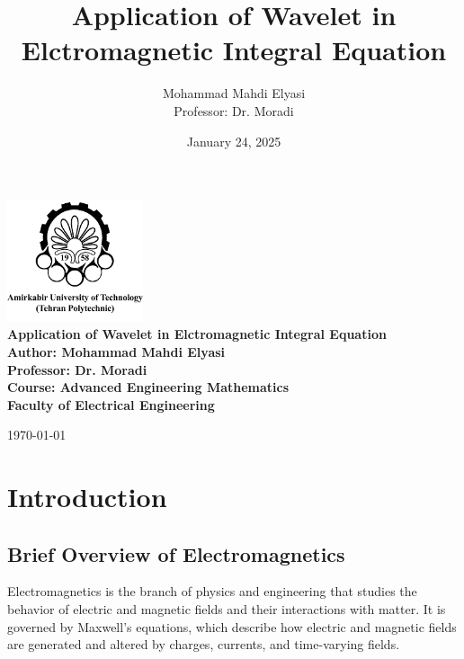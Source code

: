 \documentclass[12pt]{article}
\title{Application of Wavelet in Elctromagnetic Integral Equation}
\author{Mohammad Mahdi Elyasi \\ Professor: Dr. Moradi}
\date{January 24, 2025}
\begin{document}
\begin{center}
    \includegraphics[width=0.3\textwidth]{amirkabir.png} \\[2em]
    \LARGE \textbf{Application of Wavelet in Elctromagnetic Integral Equation} \\[1em]
    \large \textbf{Author: Mohammad Mahdi Elyasi} \\[1em]
    \large \textbf{Professor: Dr. Moradi}\\[1em]
    \large \textbf{Course: Advanced Engineering Mathematics} \\[4em]
    \large \textbf{Faculty of Electrical Engineering} \\[2em]

\end{center}

\vfill
\begin{center}
    \large \today
\end{center}


\newpage

\tableofcontents
\newpage

\section{Introduction}

\subsection{Brief Overview of Electromagnetics}
Electromagnetics is the branch of physics and engineering that studies the behavior of electric and magnetic fields and their interactions with matter. It is governed by Maxwell’s equations, which describe how electric and magnetic fields are generated and altered by charges, currents, and time-varying fields.
\end{document}
